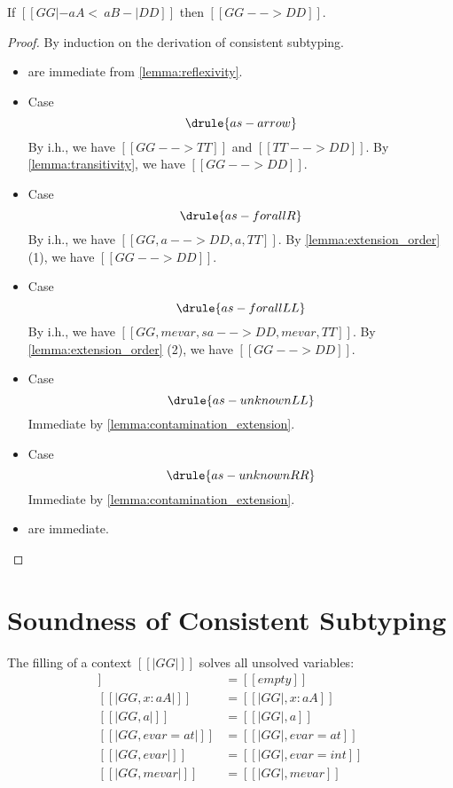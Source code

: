 \begin{lemma}   \label{lemma:sub_extension}
  If $ [[GG |- aA <~ aB -| DD]]  $ then $ [[GG --> DD]]$.
\end{lemma}
\begin{proof}
  By induction on the derivation of consistent subtyping.

  \begin{itemize}
  \item {} are immediate from \cref{lemma:reflexivity}.

  \item Case \[ \drule{as-arrow} \]
    By i.h., we have $[[GG --> TT]]$ and $[[TT --> DD]]$. By \cref{lemma:transitivity}, we have $[[GG --> DD]]$.

  \item Case \[ \drule{as-forallR} \]
    By i.h., we have $[[GG , a --> DD , a , TT]]$. By \cref{lemma:extension_order} (1), we have $[[GG --> DD]]$.


  \item Case \[ \drule{as-forallLL} \]
    By i.h., we have $[[GG, mevar, sa --> DD, mevar, TT]]$. By \cref{lemma:extension_order} (2), we have $[[GG --> DD]]$.


  \item Case \[ \drule{as-unknownLL}  \] Immediate by \cref{lemma:contamination_extension}.

  \item Case \[ \drule{as-unknownRR}  \] Immediate by \cref{lemma:contamination_extension}.


  \item {} are immediate.

  \end{itemize}

\end{proof}


\newpage

\section{Soundness of Consistent Subtyping}


\begin{definition}[Filling]   \label{def:filling}
  The filling of a context $[[ | GG | ]]$ solves all unsolved variables:
  \begin{align*}
    [[| empty |]] &= [[ empty ]] \\
    [[|GG , x : aA|]] &= [[|GG| , x : aA]] \\
    [[|GG, a|]] &= [[|GG| , a]] \\
    [[|GG, evar = at|]] &= [[|GG| , evar = at]] \\
    [[|GG, evar|]] &= [[|GG| , evar = int]] \\
    [[|GG, mevar|]] &= [[|GG| , mevar]]
  \end{align*}
\end{definition}


